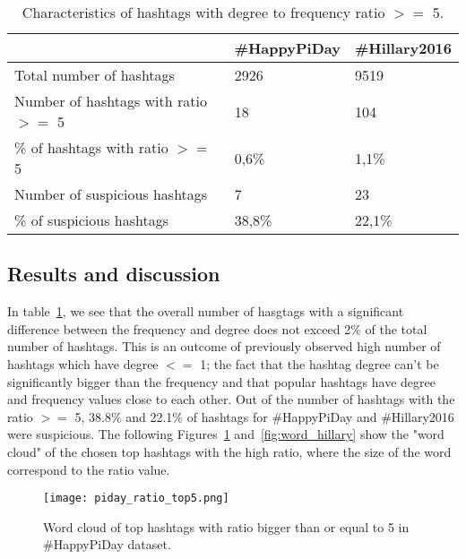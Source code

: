 \documentclass[journal, a4paper, 12pt]{article}
\begin{document}
  \begin{table}[!hbt]
            \begin{center}
            \caption{Characteristics of hashtags with degree to frequency ratio $>=$ 5.}
            \label{tab:hashtagratio}
            \begin{tabular}{|p{5cm}|p{3cm}|p{3cm}|}
                  \hline
                   & \#HappyPiDay & \#Hillary2016 \\
            \hline
                  Total number of hashtags & 2926 & 9519 \\
                  \hline
                  Number of hashtags with ratio $>=$ 5 & 18  &  104 \\
                  \hline
                  \% of hashtags with ratio $>=$ 5 & 0,6\% & 1,1\%\\
            \hline
            Number of suspicious hashtags & 7 & 23 \\
                  \hline
            \% of suspicious hashtags & 38,8\% & 22,1\%\\
                  \hline
            \end{tabular}
            \end{center}
      \end{table}

\subsection{Results and discussion}
In table~\ref{tab:hashtagratio}, we see that the overall number of hasgtags with a significant difference between the frequency and degree does not exceed 2\% of the total number of hashtags. This is an outcome of previously observed high number of hashtags which have degree $<=$ 1; the fact that the hashtag degree can't be significantly bigger than the frequency and that popular hashtags have degree and frequency values close to each other. Out of the number of hashtags with the ratio $>=$ 5, 38.8\%  and 22.1\% of hashtags for \#HappyPiDay and \#Hillary2016 were suspicious. The following Figures~\ref{fig:word_piday} and~\ref{fig:word_hillary} show the "word cloud" of the chosen top hashtags with the high ratio, where the size of the word correspond to the ratio value.
\\
        
     \begin{figure}[!hbt]
            \begin{center}
            \texttt{[image: piday\_ratio\_top5.png]}
            \caption{Word cloud of top hashtags with ratio bigger than or equal to 5 in \#HappyPiDay dataset.}
            \label{fig:word_piday}
            \end{center}
      \end{figure}
    
\end{document}
